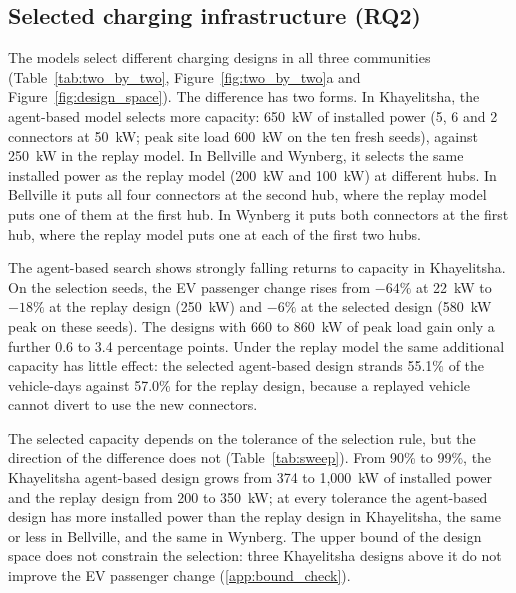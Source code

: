 \documentclass{elsarticle}
\begin{document}
\subsection{Selected charging infrastructure (RQ2)}
\label{sec:results_rq2}

The models select different charging designs in all three communities (Table~\ref{tab:two_by_two}, Figure~\ref{fig:two_by_two}a and Figure~\ref{fig:design_space}). The difference has two forms. In Khayelitsha, the agent-based model selects more capacity: 650~kW of installed power (5, 6 and 2 connectors at 50~kW; peak site load 600~kW on the ten fresh seeds), against 250~kW in the replay model. In Bellville and Wynberg, it selects the same installed power as the replay model (200~kW and 100~kW) at different hubs. In Bellville it puts all four connectors at the second hub, where the replay model puts one of them at the first hub. In Wynberg it puts both connectors at the first hub, where the replay model puts one at each of the first two hubs.

The agent-based search shows strongly falling returns to capacity in Khayelitsha. On the selection seeds, the EV passenger change rises from $-64\%$ at 22~kW to $-18\%$ at the replay design (250~kW) and $-6\%$ at the selected design (580~kW peak on these seeds). The designs with 660 to 860~kW of peak load gain only a further 0.6 to 3.4 percentage points. Under the replay model the same additional capacity has little effect: the selected agent-based design strands 55.1\% of the vehicle-days against 57.0\% for the replay design, because a replayed vehicle cannot divert to use the new connectors.

The selected capacity depends on the tolerance of the selection rule, but the direction of the difference does not (Table~\ref{tab:sweep}). From 90\% to 99\%, the Khayelitsha agent-based design grows from 374 to 1,000~kW of installed power and the replay design from 200 to 350~kW; at every tolerance the agent-based design has more installed power than the replay design in Khayelitsha, the same or less in Bellville, and the same in Wynberg. The upper bound of the design space does not constrain the selection: three Khayelitsha designs above it do not improve the EV passenger change (\ref{app:bound_check}).
\end{document}
